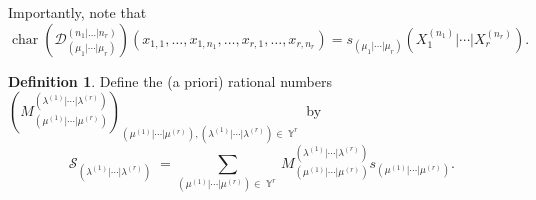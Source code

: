 \documentclass[12pt,reqno]{amsart}
\theoremstyle{definition}
\newtheorem{defn}[thm]{Definition}
\DeclareMathOperator{\Par}{\mathbb{Y}}
\DeclareMathOperator{\Char}{\mathrm{char}}
\DeclareMathOperator{\cS}{\mathcal{S}}
\begin{document}
Importantly, note that 
$$\Char \left( \mathcal{D}^{(n_1|\ldots|n_r)}_{(\mu_1|\cdots|\mu_r)} \right) (x_{1,1},\ldots, x_{1,n_1},\ldots, x_{r,1},\ldots,x_{r,n_r}) = s_{(\mu_1|\cdots|\mu_r)}(X_1^{(n_1)}|\cdots |X_{r}^{(n_r)}).$$

\begin{defn}
    Define the (a priori) rational numbers $(M_{(\mu^{(1)}|\cdots | \mu^{(r)})}^{(\lambda^{(1)}|\cdots | \lambda^{(r)})})_{(\mu^{(1)}|\cdots | \mu^{(r)}),(\lambda^{(1)}|\cdots | \lambda^{(r)}) \in \Par^r}$ by 
    $$\cS_{(\lambda^{(1)}|\cdots | \lambda^{(r)})} = \sum_{(\mu^{(1)}|\cdots | \mu^{(r)}) \in \Par^r} M_{(\mu^{(1)}|\cdots | \mu^{(r)})}^{(\lambda^{(1)}|\cdots | \lambda^{(r)})} s_{(\mu^{(1)}|\cdots | \mu^{(r)})}.$$
\end{defn}
\end{document}
